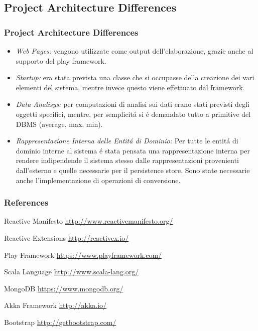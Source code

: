 \documentclass{beamer}
\begin{document}
\subsection{Project Architecture Differences}

\begin{frame}
  \frametitle{Project Architecture Differences}
  \begin{itemize}
    \item \textit{Web Pages:} vengono utilizzate come output dell'elaborazione, grazie anche al supporto del play framework.
    \item \textit{Startup:} era stata prevista una classe che si occupasse della creazione dei vari elementi del sistema, mentre invece questo viene effettuato dal framework.
    \item \textit{Data Analisys:} per computazioni di analisi sui dati erano stati previsti degli oggetti specifici, mentre, per semplicit\'a si \'e demandato tutto a primitive del DBMS (average, max, min).
    \item \textit{Rappresentazione Interna delle Entit\'a di Dominio:} Per tutte le entit\'a di dominio interne al sistema \'e stata pensata una rappresentazione interna per rendere indipendende il sistema stesso dalle rappresentazioni provenienti dall'esterno e quelle necessarie per il persistence store. Sono state necessarie anche l'implementazione di operazioni di conversione.
  \end{itemize}
\end{frame}

\begin{frame}
\frametitle{References}
\footnotesize{
\begin{thebibliography}{99} %
   Reactive Manifesto
    \newblock \url{http://www.reactivemanifesto.org/}

   Reactive Extensions
    \newblock \url{http://reactivex.io/}

   Play Framework
    \newblock \url{https://www.playframework.com/}

   Scala Language
    \newblock \url{http://www.scala-lang.org/}

   MongoDB
    \newblock \url{https://www.mongodb.org/}


   Akka Framework
    \newblock \url{http://akka.io/}


   Bootstrap
    \newblock \url{http://getbootstrap.com/}

\end{thebibliography}
}
\end{frame}
\end{document}
